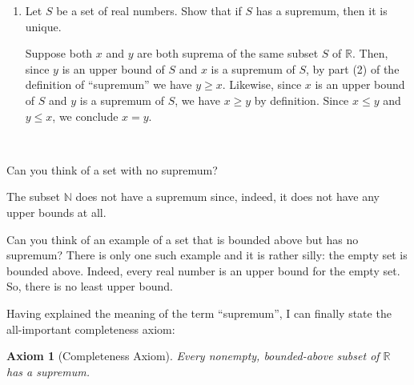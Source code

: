 \documentclass[12pt]{amsart}
\newcommand{\R}{{\mathbb{R}}}
\newcommand{\N}{\mathbb{N}}
\numberwithin{equation}{section}
\theoremstyle{plain} %
\newtheorem*{axiom*}{Axiom}
\theoremstyle{definition}
\theoremstyle{remark}
\begin{document}
\begin{enumerate}
\item Let $S$ be a set of real numbers. Show that if $S$ has a supremum, then it is unique.
\begin{framed}
Suppose both $x$ and $y$ are both suprema 
  of the same subset $S$ of $\R$.  Then, since $y$ is an upper bound of $S$ and $x$ is a supremum of $S$, by part (2) of the definition of ``supremum''
  we have $y \geq x$. Likewise, since $x$ is an upper
bound of $S$ and $y$ is a supremum of $S$, we have 
$x \geq y$ by definition.  Since $x \leq y$ and $y \leq x$, we conclude $x = y$.  
\end{framed}
\end{enumerate}

\

\newpage

Can you think of a set with no supremum?

The subset $\N$ does not have a supremum since, indeed, it does not have any upper bounds at all.


Can you think of an example of a set that is bounded above but has no supremum? There is only one such example and it is rather silly: the empty set is
bounded above. Indeed, every real number is an upper bound for the empty set. So, there is no least upper bound.

Having explained the meaning of the term ``supremum'', I can finally state the all-important completeness axiom:


\begin{axiom*}[Completeness Axiom] Every nonempty, bounded-above subset of $\R$ has a supremum.
\end{axiom*}




%
%
%
%
%
%
%
%
%
%
%
%
%
%
%
\end{document}
